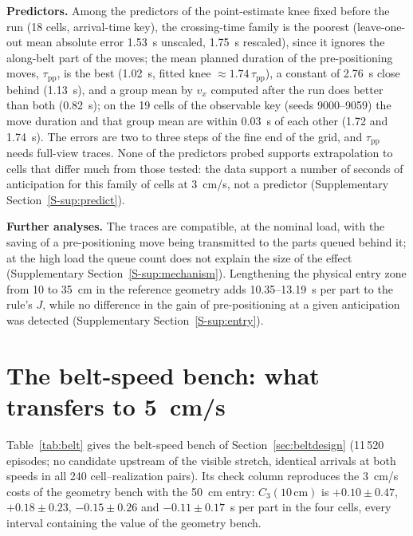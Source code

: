 \documentclass[11pt,a4paper]{article}
\newcommand{\nj}{\textsc{nj}}
\newcommand{\tpp}{\tau_{\mathrm{pp}}}
\newcommand{\supsec}[1]{Supplementary Section~\ref{S-#1}}
\begin{document}
\textbf{Predictors.} Among the predictors of the point-estimate knee fixed before the run
(18 cells, arrival-time key), the crossing-time family is the poorest (leave-one-out mean
absolute error 1.53~s unscaled, 1.75~s rescaled), since it ignores the along-belt part of
the moves; the mean planned duration of the pre-positioning moves, $\tpp$, is the best
(1.02~s, fitted knee $\approx1.74\,\tpp$), a constant of 2.76~s close behind (1.13~s), and a
group mean by $v_x$ computed after the run does better than both (0.82~s); on the 19 cells
of the observable key (seeds 9000--9059) the move duration and that group mean are within
0.03~s of each other (1.72 and 1.74~s). The errors are two to three steps of the fine end
of the grid, and $\tpp$ needs full-view traces. None of the predictors probed supports
extrapolation to cells that differ much from those tested: the data support a number of
seconds of anticipation for this family of cells at 3~cm/s, not a predictor
(\supsec{sup:predict}).

\textbf{Further analyses.} The traces are compatible, at the nominal load, with the saving
of a pre-positioning move being transmitted to the parts queued behind it; at the high
load the queue count does not explain the size of the effect (\supsec{sup:mechanism}).
Lengthening the physical entry zone from 10 to 35~cm in the reference geometry adds
10.35--13.19~s per part to the rule's $J$, while no difference in the gain of
pre-positioning at a given anticipation was detected (\supsec{sup:entry}).

\section{The belt-speed bench: what transfers to 5~cm/s}\label{sec:belt}
Table~\ref{tab:belt} gives the belt-speed bench of Section~\ref{sec:beltdesign} (11\,520
episodes; no candidate upstream of the visible stretch, identical arrivals at both speeds
in all 240 cell--realization pairs). Its check column reproduces the 3~cm/s costs of the
geometry bench with the 50~cm entry: $C_3(10\,\mathrm{cm})$ is $+0.10\pm0.47$,
$+0.18\pm0.23$, $-0.15\pm0.26$ and $-0.11\pm0.17$~s per part in the four cells, every
interval containing the value of the geometry bench.

\begin{table}[t]
\centering\small
\caption{Belt-speed bench, \nj\ with the observable tie-break, nominal load, Poisson
arrivals, 50~cm entry, 60 paired realizations (seeds 10000--10059, used once): the full-view benefit
$G_v(50\,\mathrm{cm})$ at 3 and at 5~cm/s with the benefit criterion, the paired costs at
5~cm/s of 10~cm (2.00~s) and 16.7~cm (3.33~s) against 50~cm, the check column
$C_3(10\,\mathrm{cm})$ (the 3.33~s cost at 3~cm/s, to be compared with
Section~\ref{sec:cost}), and the frozen verdict (conservative reading, margin 0.5~s per
part). Seconds per part, 95\,\% CI.}
\label{tab:belt}
\resizebox{\linewidth}{!}{}
\end{table}
\end{document}
